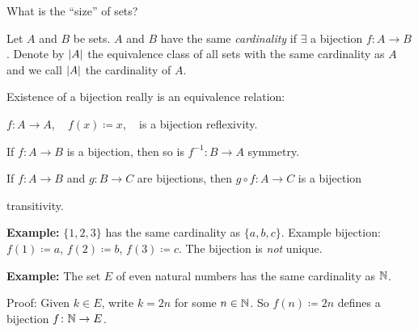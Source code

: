 \documentclass[10pt,aspectratio=149]{beamer}
\begin{document}
\begin{frame}
What is the ``size'' of sets?

\pause

\begin{definition}
Let $A$ and $B$ be sets.  $A$ and $B$ have the same
\emph{cardinality}
if $\exists$ a bijection $f \colon A \to B$.
\pause
Denote by $\left\lvert {A} \right\rvert$ the equivalence class of all sets with the same cardinality as
$A$ and we call $\left\lvert {A} \right\rvert$ the cardinality of $A$.
\end{definition}

\pause
Existence of a bijection really is an equivalence relation:

\pause
$f \colon A \to A$, ~ $f(x) \coloneqq x$, ~ is a bijection \wthus reflexivity.

\pause
If $f \colon A \to B$ is a bijection, then so is $f^{-1} \colon B \to A$ \wthus symmetry.

\pause
If $f \colon A \to B$ and $g \colon B \to C$ are bijections, then
$g \circ f \colon A \to C$ is a bijection

\wthus transitivity.

\medskip
\pause

\textbf{Example:}
$\{ 1,2,3 \}$ has the same cardinality as $\{ a,b,c \}$.
\pause
Example bijection: $f(1) \coloneqq a$, $f(2) \coloneqq b$, $f(3) \coloneqq c$.
\pause  The bijection is \emph{not} unique.

\medskip
\pause

\textbf{Example:}
The set $E$ of even natural numbers has the same cardinality as ${\mathbb{N}}$.

\pause
Proof:
Given $k \in E$, write $k=2n$ for some $n \in {\mathbb{N}}$.
\pause
So
$f(n) \coloneqq 2n$ defines a bijection $f \colon {\mathbb{N}} \to E$.

\end{frame}
\end{document}
